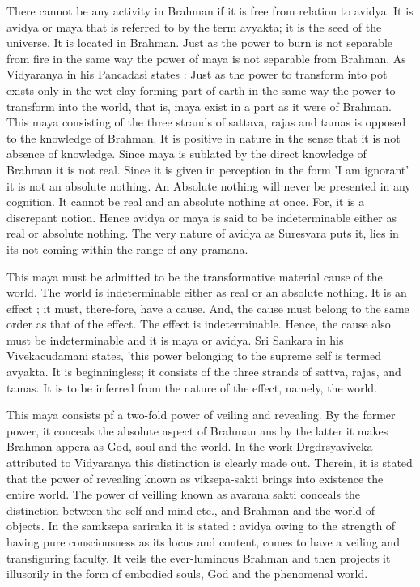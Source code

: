 There cannot be any activity in Brahman if it is free from relation to avidya. It is avidya or maya that is referred to by the term avyakta; it is the seed of the universe. It is located in Brahman. Just as the power to burn is not separable from fire in the same way the power of maya is not separable from Brahman. As Vidyaranya in his Pancadasi states : Just as the power to transform into pot exists only in the wet clay forming part of earth in the same way the power to transform into the world, that is, maya exist in a part as it were of Brahman. This maya consisting of the three strands of sattava, rajas and tamas is opposed to the knowledge of Brahman. It is positive in nature in the sense that it is not absence of knowledge. Since maya is sublated by the direct knowledge of Brahman it is not real. Since it is given in perception in the form 'I am ignorant' it is not an absolute nothing. An Absolute nothing will never be presented in any cognition. It cannot be real and an absolute nothing at once. For, it is a discrepant notion. Hence avidya or maya is said to be indeterminable either as real or absolute nothing. The very nature of avidya as Suresvara puts it, lies in its not coming within the range of any pramana.

This maya must be admitted to be the transformative material cause of the world. The world is indeterminable either as real or an absolute nothing. It is an effect ; it must, there-fore, have a cause. And, the cause must belong to the same order as that of the effect. The effect is indeterminable. Hence, the cause also must be indeterminable and it is maya or avidya. Sri Sankara in his Vivekacudamani states, 'this power belonging to the supreme self is termed avyakta. It is beginningless; it consists of the three strands of sattva, rajas, and tamas. It is to be inferred from the nature of the effect, namely, the world. 

This maya consists pf a two-fold power of veiling and revealing. By the former power, it  conceals the absolute aspect of Brahman ans by the latter it makes Brahman appera as God, soul and the world. In the work Drgdrsyaviveka attributed to Vidyaranya this distinction is clearly made out. Therein, it is stated that the power of revealing known as viksepa-sakti brings into existence the entire world. The power of veilling known as avarana sakti conceals the distinction between the self and mind etc., and Brahman and the world of objects. In the samksepa sariraka it is stated : avidya owing to the strength of having pure consciousness as its locus and content, comes to have a veiling  and transfiguring faculty. It veils the ever-luminous Brahman and then projects it illusorily in the form of embodied souls, God and the phenomenal world. 

